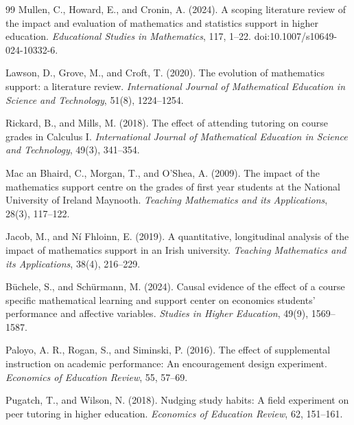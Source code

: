 \documentclass[11pt,letterpaper]{article}
\begin{document}
\begin{thebibliography}{99}
Mullen, C., Howard, E., and Cronin, A. (2024).
\newblock A scoping literature review of the impact and evaluation of mathematics and statistics support in higher education.
\newblock \emph{Educational Studies in Mathematics}, 117, 1--22. doi:10.1007/s10649-024-10332-6.

Lawson, D., Grove, M., and Croft, T. (2020).
\newblock The evolution of mathematics support: a literature review.
\newblock \emph{International Journal of Mathematical Education in Science and Technology}, 51(8), 1224--1254.

Rickard, B., and Mills, M. (2018).
\newblock The effect of attending tutoring on course grades in Calculus I.
\newblock \emph{International Journal of Mathematical Education in Science and Technology}, 49(3), 341--354.

Mac an Bhaird, C., Morgan, T., and O'Shea, A. (2009).
\newblock The impact of the mathematics support centre on the grades of first year students at the National University of Ireland Maynooth.
\newblock \emph{Teaching Mathematics and its Applications}, 28(3), 117--122.

Jacob, M., and N\'{i} Fhloinn, E. (2019).
\newblock A quantitative, longitudinal analysis of the impact of mathematics support in an Irish university.
\newblock \emph{Teaching Mathematics and its Applications}, 38(4), 216--229.

B\"uchele, S., and Sch\"urmann, M. (2024).
\newblock Causal evidence of the effect of a course specific mathematical learning and support center on economics students' performance and affective variables.
\newblock \emph{Studies in Higher Education}, 49(9), 1569--1587.

Paloyo, A. R., Rogan, S., and Siminski, P. (2016).
\newblock The effect of supplemental instruction on academic performance: An encouragement design experiment.
\newblock \emph{Economics of Education Review}, 55, 57--69.

Pugatch, T., and Wilson, N. (2018).
\newblock Nudging study habits: A field experiment on peer tutoring in higher education.
\newblock \emph{Economics of Education Review}, 62, 151--161.


\end{thebibliography}
\end{document}
